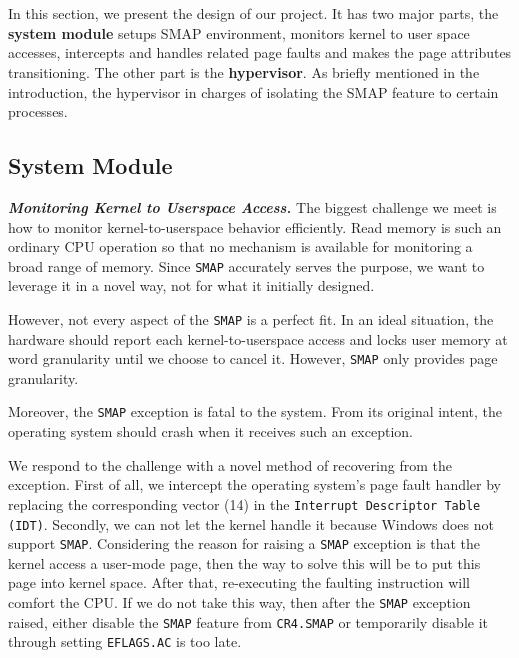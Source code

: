 
\section{\name}
\label{sec:design}

In this section, we present the design of our project. It has two major parts, the \textbf{system module} setups SMAP environment, monitors kernel to user space accesses, intercepts and handles related page faults and makes the page attributes transitioning. The other part is the \textbf{hypervisor}. As briefly mentioned in the introduction, the hypervisor in charges of isolating the SMAP feature to certain processes.


\subsection{System Module}

\textbf{\textit{Monitoring Kernel to Userspace Access.}} The biggest challenge we meet is how to monitor kernel-to-userspace behavior efficiently. Read memory is such an ordinary CPU operation so that no mechanism is available for monitoring a broad range of memory. Since \texttt{SMAP} accurately serves the purpose, we want to leverage it in a novel way, not for what it initially designed.

However, not every aspect of the \texttt{SMAP} is a perfect fit. In an ideal situation, the hardware should report each kernel-to-userspace access and locks user memory at word granularity until we choose to cancel it.  However, \texttt{SMAP} only provides page granularity. 

Moreover, the \texttt{SMAP} exception is fatal to the system. From its original intent, the operating system should crash when it receives such an exception.



We respond to the challenge with a novel method of recovering from the exception. First of all, we intercept the operating system's page fault handler by replacing the corresponding vector (14) in the \texttt{Interrupt Descriptor Table (IDT)}. Secondly, we can not let the kernel handle it because Windows does not support \texttt{SMAP}. Considering the reason for raising a \texttt{SMAP} exception is that the kernel access a user-mode page, then the way to solve this will be to put this page into kernel space. After that, re-executing the faulting instruction will comfort the CPU. If we do not take this way, then after the \texttt{SMAP} exception raised, either disable the \texttt{SMAP} feature from \texttt{CR4.SMAP} or temporarily disable it through setting \texttt{EFLAGS.AC} is too late. 

